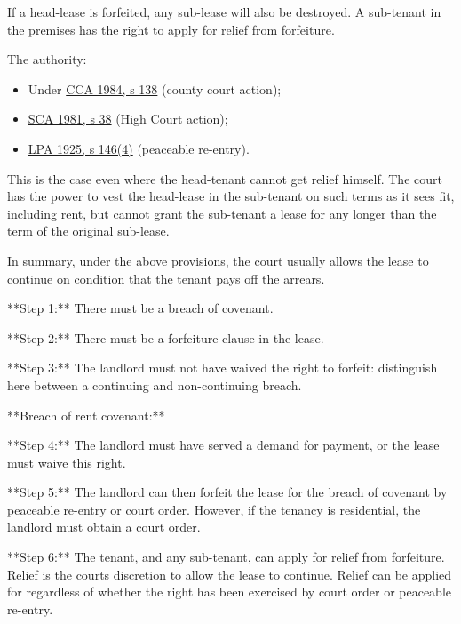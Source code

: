 \documentclass[
]{article}
\newenvironment{Shaded}{}{}
\newcommand{\NormalTok}[1]{#1}
\providecommand{\tightlist}{%
  \setlength{\itemsep}{0pt}\setlength{\parskip}{0pt}}
\begin{document}
If a head-lease is forfeited, any sub-lease will also be destroyed. A
sub-tenant in the premises has the right to apply for relief from
forfeiture.

The authority:

\begin{itemize}
\tightlist
\item
  Under
  \href{https://www.legislation.gov.uk/ukpga/1984/28/section/138}{CCA
  1984, s 138} (county court action);
\item
  \href{https://www.legislation.gov.uk/ukpga/1981/54/section/38}{SCA
  1981, s 38} (High Court action);
\item
  \href{https://www.legislation.gov.uk/ukpga/Geo5/15-16/20/section/146}{LPA
  1925, s 146(4)} (peaceable re-entry).
\end{itemize}

This is the case even where the head-tenant cannot get relief himself.
The court has the power to vest the head-lease in the sub-tenant on such
terms as it sees fit, including rent, but cannot grant the sub-tenant a
lease for any longer than the term of the original sub-lease.

In summary, under the above provisions, the court usually allows the
lease to continue on condition that the tenant pays off the arrears.

\begin{Shaded}
\begin{Highlighting}[]
\NormalTok{**Step 1:** There must be a breach of covenant.}

\NormalTok{**Step 2:** There must be a forfeiture clause in the lease.}

\NormalTok{**Step 3:** The landlord must not have waived the right to forfeit: distinguish here between a continuing and non{-}continuing breach.}

\NormalTok{**Breach of rent covenant:**}

\NormalTok{**Step 4:** The landlord must have served a demand for payment, or the lease must waive this right.}

\NormalTok{**Step 5:** The landlord can then forfeit the lease for the breach of covenant by peaceable re{-}entry or court order. However, if the tenancy is residential, the landlord must obtain a court order.}

\NormalTok{**Step 6:** The tenant, and any sub{-}tenant, can apply for relief from forfeiture. Relief is the court\textquotesingle{}s discretion to allow the lease to continue. Relief can be applied for regardless of whether the right has been exercised by court order or peaceable re{-}entry.}
\end{Highlighting}
\end{Shaded}
\end{document}
